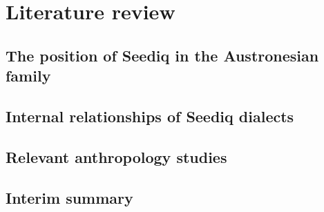 \chapter{Literature review}
\lipsum[1]

\section{The position of Seediq in the Austronesian family} \label{sec:position}
\lipsum[1-5]

\section{Internal relationships of Seediq dialects}
\lipsum[1-5]

\section{Relevant anthropology studies}
\lipsum[1-5]

\section{Interim summary}
\lipsum[1]
